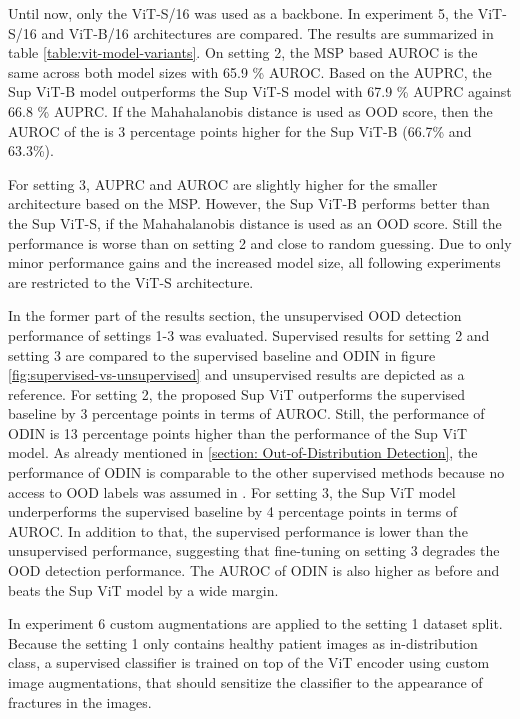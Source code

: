 \par
Until now, only the ViT-S/16 was used as a backbone.
In experiment 5, the ViT-S/16 and ViT-B/16 architectures are compared.
The results are summarized in table \ref{table:vit-model-variants}.
On setting 2, the MSP based AUROC is the same across both model sizes with 65.9 \% AUROC.
Based on the AUPRC, the Sup ViT-B model outperforms the Sup ViT-S model with 67.9 \% AUPRC against 66.8 \% AUPRC.
If the Mahahalanobis distance is used as OOD score, then the AUROC of the is 3 percentage points higher for the Sup ViT-B (66.7\% and 63.3\%).
\par
For setting 3, AUPRC and AUROC are slightly higher for the smaller architecture based on the MSP.
However, the Sup ViT-B performs better than the Sup ViT-S, if the Mahahalanobis distance is used as an OOD score.
Still the performance is worse than on setting 2 and close to random guessing.
Due to only minor performance gains and the increased model size, all following experiments are restricted to the ViT-S architecture.
\par
{}
In the former part of the results section, the unsupervised OOD detection performance of settings 1-3 was evaluated.
Supervised results for setting 2 and setting 3 are compared to the supervised baseline and ODIN in figure \ref{fig:supervised-vs-unsupervised} and unsupervised results are depicted as a reference.
For setting 2, the proposed Sup ViT outperforms the supervised baseline by 3 percentage points in terms of AUROC.
Still, the performance of ODIN is 13 percentage points higher than the performance of the Sup ViT model.
As already mentioned in \ref{section: Out-of-Distribution Detection}, the performance of ODIN is comparable to the other supervised methods because no access to OOD labels was assumed in \citep{Berger2021}.
For setting 3, the Sup ViT model underperforms the supervised baseline by 4 percentage points in terms of AUROC.
In addition to that, the supervised performance is lower than the unsupervised performance, suggesting that fine-tuning on setting 3 degrades the OOD detection performance.
The AUROC of ODIN is also higher as before and beats the Sup ViT model by a wide margin.
\par
In experiment 6 custom augmentations are applied to the setting 1 dataset split.
Because the setting 1 only contains healthy patient images as in-distribution class, a supervised classifier is trained on top of the ViT encoder using custom image augmentations, that should sensitize the classifier to the appearance of fractures in the images.
